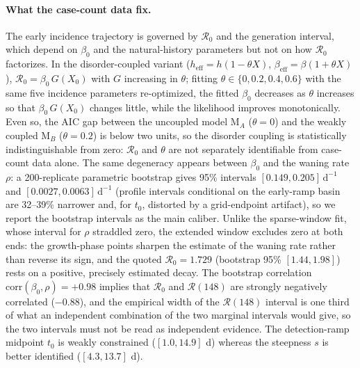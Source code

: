 \documentclass[10pt]{plos}
\newcommand{\Reff}{\mathcal{R}}
\begin{document}
\paragraph{What the case-count data fix.}
The early incidence trajectory is governed by $\Reff_0$ and the
generation interval, which depend on $\beta_0$ and the natural-history
parameters but not on how $\Reff_0$ factorizes. In the disorder-coupled
variant ($h_{\mathrm{eff}}=h(1-\theta X)$,
$\beta_{\mathrm{eff}}=\beta(1+\theta X)$), $\Reff_0=\beta_0\,G(X_0)$
with $G$ increasing in $\theta$; fitting $\theta\in\{0,0.2,0.4,0.6\}$
with the same five incidence parameters re-optimized, the fitted
$\beta_0$ decreases as $\theta$ increases so that $\beta_0\,G(X_0)$
changes little, while the likelihood improves monotonically. Even so,
the AIC gap between the uncoupled model M$_{A}$ ($\theta=0$) and the
weakly coupled M$_{B}$ ($\theta=0.2$) is below two units, so the
disorder coupling is statistically indistinguishable from zero:
$\Reff_0$ and $\theta$ are not separately identifiable from case-count
data alone. The same degeneracy appears between $\beta_0$ and the
waning rate $\rho$: a 200-replicate parametric bootstrap gives 95\%
intervals $[0.149,0.205]\,\mathrm{d}^{-1}$ and
$[0.0027,0.0063]\,\mathrm{d}^{-1}$ (profile intervals conditional on the
early-ramp basin are 32--39\% narrower and, for $t_0$, distorted by a
grid-endpoint artifact), so we report the bootstrap intervals as the
main caliber. Unlike the sparse-window fit, whose interval for $\rho$
straddled zero, the extended window excludes zero at both ends: the
growth-phase points sharpen the estimate of the waning rate rather than
reverse its sign, and the quoted $\Reff_0=1.729$ (bootstrap 95\%
$[1.44,1.98]$) rests on a positive, precisely estimated decay. The
bootstrap correlation $\mathrm{corr}(\beta_0,\rho)=+0.98$ implies that
$\Reff_0$ and $\Reff(148)$ are strongly negatively correlated ($-0.88$),
and the empirical width of the $\Reff(148)$ interval is one third of
what an independent combination of the two marginal intervals would
give, so the two intervals must not be read as independent evidence.
The detection-ramp midpoint $t_0$ is weakly constrained
($[1.0,14.9]$ d) whereas the steepness $s$ is better identified
($[4.3,13.7]$ d).
\end{document}
